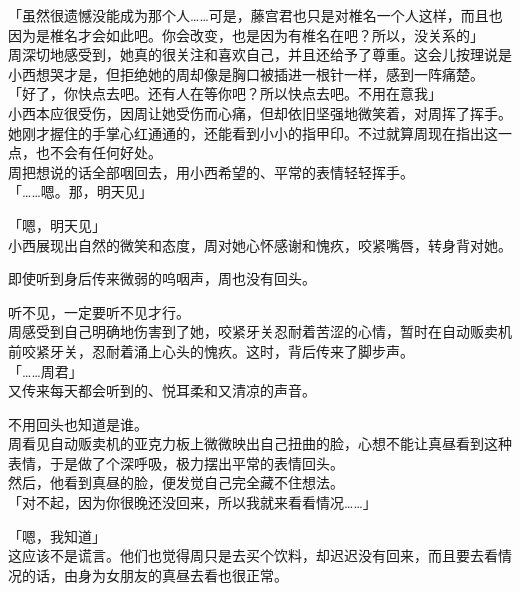 「虽然很遗憾没能成为那个人……可是，藤宫君也只是对椎名一个人这样，而且也因为是椎名才会如此吧。你会改变，也是因为有椎名在吧？所以，没关系的」\\

周深切地感受到，她真的很关注和喜欢自己，并且还给予了尊重。这会儿按理说是小西想哭才是，但拒绝她的周却像是胸口被插进一根针一样，感到一阵痛楚。\\

「好了，你快点去吧。还有人在等你吧？所以快点去吧。不用在意我」\\

小西本应很受伤，因周让她受伤而心痛，但却依旧坚强地微笑着，对周挥了挥手。\\

她刚才握住的手掌心红通通的，还能看到小小的指甲印。不过就算周现在指出这一点，也不会有任何好处。\\

周把想说的话全部咽回去，用小西希望的、平常的表情轻轻挥手。\\

「……嗯。那，明天见」

「嗯，明天见」\\

小西展现出自然的微笑和态度，周对她心怀感谢和愧疚，咬紧嘴唇，转身背对她。

即使听到身后传来微弱的呜咽声，周也没有回头。

听不见，一定要听不见才行。\\

周感受到自己明确地伤害到了她，咬紧牙关忍耐着苦涩的心情，暂时在自动贩卖机前咬紧牙关，忍耐着涌上心头的愧疚。这时，背后传来了脚步声。\\

「……周君」\\

又传来每天都会听到的、悦耳柔和又清凉的声音。

不用回头也知道是谁。\\

周看见自动贩卖机的亚克力板上微微映出自己扭曲的脸，心想不能让真昼看到这种表情，于是做了个深呼吸，极力摆出平常的表情回头。\\

然后，他看到真昼的脸，便发觉自己完全藏不住想法。\\

「对不起，因为你很晚还没回来，所以我就来看看情况……」

「嗯，我知道」\\

这应该不是谎言。他们也觉得周只是去买个饮料，却迟迟没有回来，而且要去看情况的话，由身为女朋友的真昼去看也很正常。

